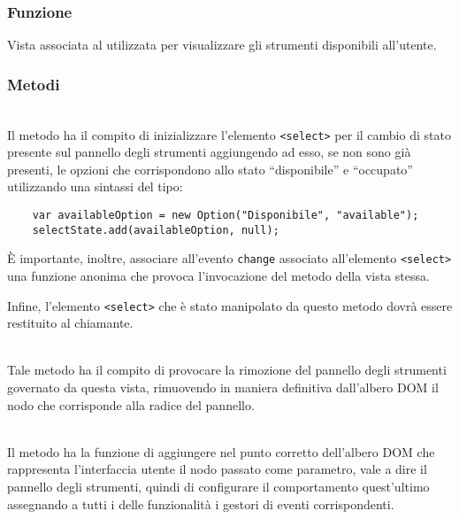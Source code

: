 \subsubsection*{Funzione}
Vista associata al   utilizzata per visualizzare gli strumenti disponibili all'utente.

\subsubsection*{Metodi}
\begin{description}
  \item{}\\
  Il metodo ha il compito di inizializzare l'elemento \verb'<select>' per il cambio di stato presente sul pannello degli strumenti aggiungendo ad esso, se non sono già presenti, le opzioni che corrispondono allo stato ``disponibile'' e ``occupato'' utilizzando una sintassi del tipo:
  \begin{verbatim}
    var availableOption = new Option("Disponibile", "available");
    selectState.add(availableOption, null);
  \end{verbatim}
  
  È importante, inoltre, associare all'evento \verb'change' associato all'elemento \verb'<select>' una funzione anonima che provoca l'invocazione del metodo  della vista stessa.
  
  Infine, l'elemento \verb'<select>' che è stato manipolato da questo metodo dovrà essere restituito al chiamante.
  
  \item{}\\
  Tale metodo ha il compito di provocare la rimozione del pannello degli strumenti governato da questa vista, rimuovendo in maniera definitiva dall'albero DOM il nodo che corrisponde alla radice del pannello.
  
  \item{}\\
  Il metodo ha la funzione di aggiungere nel punto corretto dell'albero DOM che rappresenta l'interfaccia utente il nodo passato come parametro, vale a dire il pannello degli strumenti, quindi di configurare il comportamento quest'ultimo assegnando a tutti i  delle funzionalità i gestori di eventi corrispondenti.
  

\end{description}
